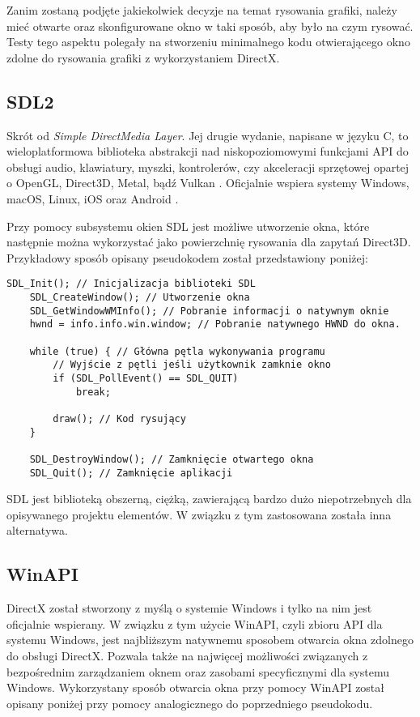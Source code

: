 Zanim zostaną podjęte jakiekolwiek decyzje na temat rysowania grafiki,
należy mieć otwarte oraz skonfigurowane okno w taki sposób, aby było na
czym rysować. Testy tego aspektu polegały na stworzeniu minimalnego kodu otwierającego
okno zdolne do rysowania grafiki z wykorzystaniem DirectX.

\subsection{SDL2}

Skrót od \emph{Simple DirectMedia Layer}. Jej drugie wydanie, napisane w
języku C, to wieloplatformowa biblioteka abstrakcji nad niskopoziomowymi
funkcjami API do obsługi audio, klawiatury, myszki, kontrolerów, czy
akceleracji sprzętowej opartej o OpenGL, Direct3D, Metal, bądź Vulkan
\cite{sdl:wiki:2024}. Oficjalnie wspiera systemy Windows, macOS, Linux, iOS oraz
Android \cite{sdl:wiki:2024}. 

Przy pomocy subsystemu okien SDL jest możliwe utworzenie okna, które
następnie można wykorzystać jako powierzchnię rysowania dla zapytań
Direct3D. Przykładowy sposób opisany pseudokodem został przedstawiony
poniżej:

\begin{lstlisting}[caption={Pseudokod inicjalizacji okna SDL2 (oryginalna treść)}, label={lst:sdl2_init}]
	SDL_Init(); // Inicjalizacja biblioteki SDL
	SDL_CreateWindow(); // Utworzenie okna
	SDL_GetWindowWMInfo(); // Pobranie informacji o natywnym oknie
	hwnd = info.info.win.window; // Pobranie natywnego HWND do okna.
	
	while (true) { // Główna pętla wykonywania programu
		// Wyjście z pętli jeśli użytkownik zamknie okno
		if (SDL_PollEvent() == SDL_QUIT)
			break;
	
		draw(); // Kod rysujący
	}
		
	SDL_DestroyWindow(); // Zamknięcie otwartego okna
	SDL_Quit(); // Zamknięcie aplikacji
\end{lstlisting}

SDL jest biblioteką obszerną, ciężką, zawierającą bardzo dużo
niepotrzebnych dla opisywanego projektu elementów. W związku z tym
zastosowana została inna alternatywa.

\subsection{WinAPI}

DirectX został stworzony z myślą o systemie Windows i tylko na nim jest
oficjalnie wspierany. W związku z tym użycie WinAPI, czyli zbioru API
dla systemu Windows, jest najbliższym natywnemu sposobem otwarcia okna
zdolnego do obsługi DirectX. Pozwala także na najwięcej możliwości
związanych z bezpośrednim zarządzaniem oknem oraz zasobami specyficznymi
dla systemu Windows. Wykorzystany sposób otwarcia okna przy pomocy WinAPI został opisany
poniżej przy pomocy analogicznego do poprzedniego pseudokodu.

